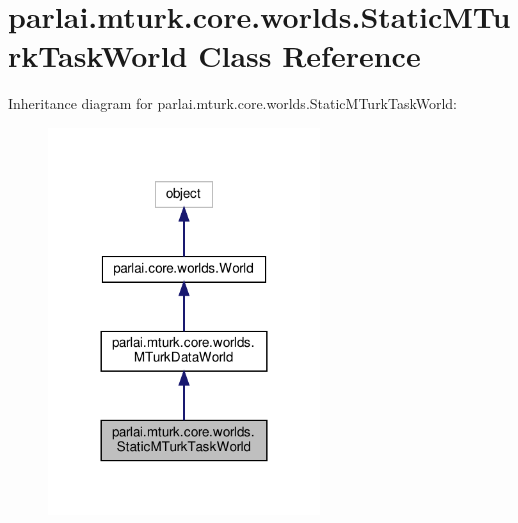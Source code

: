 \hypertarget{classparlai_1_1mturk_1_1core_1_1worlds_1_1StaticMTurkTaskWorld}{}\section{parlai.\+mturk.\+core.\+worlds.\+Static\+M\+Turk\+Task\+World Class Reference}
\label{classparlai_1_1mturk_1_1core_1_1worlds_1_1StaticMTurkTaskWorld}


Inheritance diagram for parlai.\+mturk.\+core.\+worlds.\+Static\+M\+Turk\+Task\+World\+:
\nopagebreak
\begin{figure}[H]
\begin{center}
\leavevmode
\includegraphics[width=204pt]{da/d6e/classparlai_1_1mturk_1_1core_1_1worlds_1_1StaticMTurkTaskWorld__inherit__graph}
\end{center}
\end{figure}


